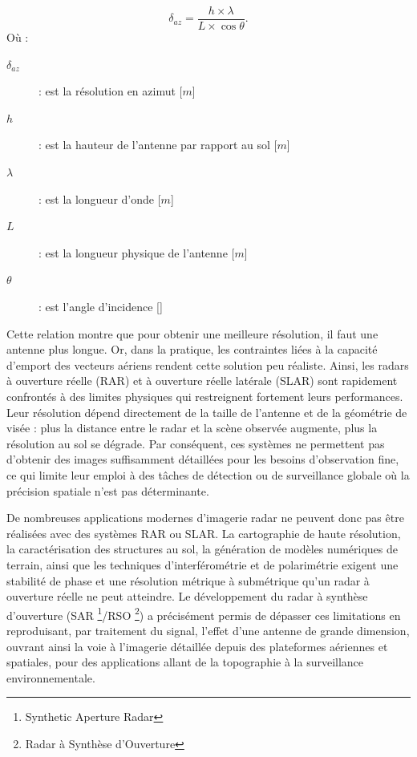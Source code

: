 \begin{equation}
\delta_{az} = \frac{h\times\lambda}{L\times \cos{\theta}}.
\label{eq:resolution_azimut_rar}
\end{equation}
Où :
\begin{description}
    \item[$\delta_{az}$] : est la résolution en azimut [$m$]
    \item[$h$] : est la hauteur de l'antenne par rapport au sol [$m$]
    \item[$\lambda$] : est la longueur d’onde [$m$]
    \item[$L$] : est la longueur physique de l’antenne [$m$]
    \item[$\theta$] : est l'angle d'incidence [\textdegree]
\end{description}

Cette relation montre que pour obtenir une meilleure résolution, il faut une antenne plus longue. Or, dans la pratique, les contraintes liées à la capacité d’emport des vecteurs aériens rendent cette solution peu réaliste. Ainsi, les radars à ouverture réelle (RAR) et à ouverture réelle latérale (SLAR) sont rapidement confrontés à des limites physiques qui restreignent fortement leurs performances. Leur résolution dépend directement de la taille de l’antenne et de la géométrie de visée : plus la distance entre le radar et la scène observée augmente, plus la résolution au sol se dégrade. Par conséquent, ces systèmes ne permettent pas d’obtenir des images suffisamment détaillées pour les besoins d’observation fine, ce qui limite leur emploi à des tâches de détection ou de surveillance globale où la précision spatiale n’est pas déterminante.

De nombreuses applications modernes d’imagerie radar ne peuvent donc pas être réalisées avec des systèmes RAR ou SLAR. La cartographie de haute résolution, la caractérisation des structures au sol, la génération de modèles numériques de terrain, ainsi que les techniques d’interférométrie et de polarimétrie exigent une stabilité de phase et une résolution métrique à submétrique \cite{Forsten2025, tupin_monradar} qu’un radar à ouverture réelle ne peut atteindre. Le développement du radar à synthèse d’ouverture (SAR \footnote{Synthetic Aperture Radar}/RSO \footnote{Radar à Synthèse d'Ouverture}) a précisément permis de dépasser ces limitations en reproduisant, par traitement du signal, l’effet d’une antenne de grande dimension, ouvrant ainsi la voie à l’imagerie détaillée depuis des plateformes aériennes et spatiales, pour des applications allant de la topographie à la surveillance environnementale.

